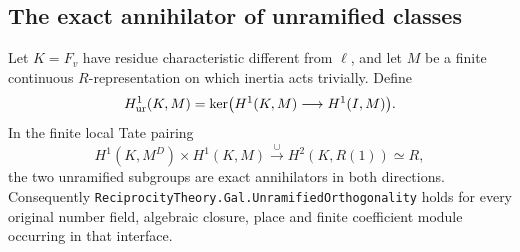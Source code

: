 \subsection{The exact annihilator of unramified classes}

\begin{proposition}
\label{prop:ld-unramified}
Let $K=F_v$ have residue characteristic different from $\ell$, and
let $M$ be a finite continuous $R$-representation on which inertia acts
trivially.  Define
\[
 H^1_{\rm ur}(K,M)=
 \ker\bigl(H^1(K,M)\longrightarrow H^1(I,M)\bigr).
\]
In the finite local Tate pairing
\[
 H^1(K,M^D)\times H^1(K,M)
 \xrightarrow{\ \cup\ }H^2(K,R(1))\simeq R,
 \tag{LD.5}
\]
the two unramified subgroups are exact annihilators in both directions.
Consequently \texttt{ReciprocityTheory.Gal.UnramifiedOrthogonality}
holds for every original number field, algebraic closure, place and
finite coefficient module occurring in that interface.
\end{proposition}

